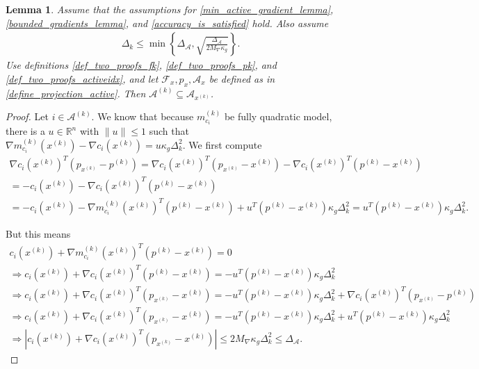 \documentclass{article}
\newtheorem{lemma}[theorem]{Lemma}
\theoremstyle{case}
\newcommand{\maxgrad}{{M_{\nabla}}}
\newcommand{\xk}{{x^{(k)}}}
\newcommand{\Rn}{\mathbb R^n}
\newcommand{\dk}{\Delta_k}
\newcommand{\gmcik}{{\nabla m_{c_i}^{(k)}(\xk)}}
\newcommand{\minactivegraddelta}{{\Delta_{\mathcal A}}}
\begin{document}
\begin{lemma}
\label{active_models_are_active}
Assume that the assumptions for 
\cref{min_active_gradient_lemma},
\cref{bounded_gradients_lemma},
and \cref{accuracy_is_satisfied}
hold.
Also assume 
\begin{align*}
\dk \le \min\left\{\minactivegraddelta, \sqrt{\frac{\minactivegraddelta}{2\maxgrad\kappa_g}}\right\}.
\end{align*}
Use definitions \cref{def_two_proofs_fk}, \cref{def_two_proofs_pk}, and \cref{def_two_proofs_activeidx}, 
and let $\mathcal F_x, p_x, \mathcal A_x$ be defined as in \cref{define_projection_active}.
Then $\mathcal A^{(k)} \subseteq \mathcal A_{\xk}$.
\end{lemma}
\begin{proof}

Let $i \in \mathcal A^{(k)}$.
We know that because $m_{c_i}^{(k)}$ be fully quadratic model, there is a $u \in \Rn$ with $\|u\| \le 1$ such that
$\gmcik - \nabla c_i(\xk) = u \kappa_g \dk^2$.
We first compute
\begin{align*}
\nabla c_i(\xk)^T\left(p_{\xk} - p^{(k)}\right) = \nabla c_i(\xk)^T\left(p_{\xk} - \xk\right) - \nabla c_i(\xk)^T\left(p^{(k)} - \xk\right) \\
= -c_i(\xk) - \nabla c_i(\xk)^T\left(p^{(k)} - \xk\right) \\
= -c_i(\xk) - \gmcik^T\left(p^{(k)} - \xk\right) + u^T\left(p^{(k)} - \xk\right) \kappa_g \dk^2 
= u^T\left(p^{(k)} - \xk\right) \kappa_g \dk^2.
\end{align*}

But this means
\begin{align*}
c_i(\xk) + \gmcik^T(p^{(k)} - \xk) = 0 \\
\Longrightarrow c_i(\xk) + \nabla c_i(\xk)^T(p^{(k)} - \xk) = -u^T(p^{(k)} - \xk) \kappa_g \dk^2 \\
\Longrightarrow c_i(\xk) + \nabla c_i(\xk)^T(p_{\xk} - \xk) = -u^T(p^{(k)} - \xk) \kappa_g \dk^2 + \nabla c_i(\xk)^T\left(p_{\xk} - p^{(k)}\right)\\
\Longrightarrow c_i(\xk) + \nabla c_i(\xk)^T(p_{\xk} - \xk) = -u^T(p^{(k)} - \xk) \kappa_g \dk^2 + u^T\left(p^{(k)} - \xk\right) \kappa_g \dk^2\\
\Longrightarrow |c_i(\xk) + \nabla c_i(\xk)^T(p_{\xk} - \xk)| \le 2\maxgrad \kappa_g \dk^2 \le \minactivegraddelta.
\end{align*}
\end{proof}
\end{document}

